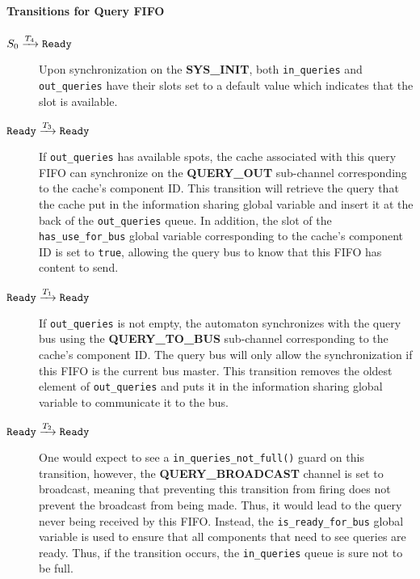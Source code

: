 \paragraph{Transitions for Query FIFO}
\begin{description}
\item[$S_0 \xrightarrow[]{T_{4}} \texttt{Ready}$]
   Upon synchronization on the \textbf{SYS\_INIT}, both \lstinline!in_queries!
   and \lstinline!out_queries! have their slots set to a default value which
   indicates that the slot is available.

\item[$\texttt{Ready} \xrightarrow[]{T_{3}} \texttt{Ready}$]
   If \lstinline!out_queries! has available spots, the cache associated with
   this query FIFO can synchronize on the \textbf{QUERY\_OUT} sub-channel
   corresponding to the cache's component ID. This transition will retrieve
   the query that the cache put in the information sharing global variable and
   insert it at the back of the \lstinline!out_queries! queue. In addition,
   the slot of the \lstinline!has_use_for_bus! global variable corresponding to
   the cache's component ID is set to \lstinline!true!, allowing the query bus
   to know that this FIFO has content to send.

\item[$\texttt{Ready} \xrightarrow[]{T_{1}} \texttt{Ready}$]
   If \lstinline!out_queries! is not empty, the automaton synchronizes with
   the query bus using the \textbf{QUERY\_TO\_BUS} sub-channel corresponding
   to the cache's component ID. The query bus will only allow the
   synchronization if this FIFO is the current bus master. This transition
   removes the oldest element of \lstinline!out_queries! and puts it in the
   information sharing global variable to communicate it to the bus.

\item[$\texttt{Ready} \xrightarrow[]{T_{2}} \texttt{Ready}$]
   One would expect to see a \lstinline!in_queries_not_full()! guard on this
   transition, however, the \textbf{QUERY\_BROADCAST} channel is set to
   broadcast, meaning that preventing this transition from firing does not
   prevent the broadcast from being made. Thus, it would lead to the query never
   being received by this FIFO. Instead, the \lstinline!is_ready_for_bus!
   global variable is used to ensure that all components that need to see
   queries are ready. Thus, if the transition occurs, the \lstinline!in_queries!
   queue is sure not to be full.


\end{description}
